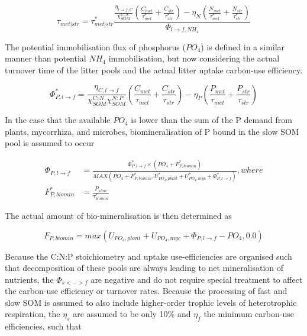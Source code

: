 \begin{equation}
 \tau_{met|str} = \tau^{*}_{met|str} \frac{\frac{\eta_{l \rightarrow f,C}}{\chi_{SOM}^{C:N}} (\frac{C_{met}}{\tau^{*}_{met}} + \frac{C_{str}}{\tau^{*}_{str}}) - \eta_N (\frac{N_{met}}{\tau^{*}_{met}} + \frac{N_{str}}{\tau^{*}_{str}})}{\Phi_{l \rightarrow f,NH_4}}
\end{equation}

The potential immobilisation flux of phosphorus ($PO_4$) is defined in a similar manner than potential $NH_4$ immobilisation, but now considering the actual turnover time of the litter pools and the actual litter uptake carbon-use efficiency.

\begin{equation}
\Phi^{*}_{P,l \rightarrow f} = \frac{\eta_{C,l \rightarrow f}}{\chi_{SOM}^{C:N}\chi_{SOM}^{N:P}} (\frac{C_{met}}{\tau_{met}} + \frac{C_{str}}{\tau_{str}}) - \eta_P (\frac{P_{met}}{\tau_{met}} + \frac{P_{str}}{\tau_{str}})
\end{equation} 

In the case that the available $PO_4$ is lower than the sum of the P demand from plants, mycorrhiza, and microbes, biomineralisation of P bound in the slow SOM pool is assumed to occur 

\begin{subequations}\label{eq:sb:simple_pot_p_immobilisation}
\begin{align}
\Phi_{P,l \rightarrow f} &= \frac{\Phi^{*}_{P,l \rightarrow f} \times (PO_4 + F^{*}_{P,biomin})}{MAX(PO_4 + F^{*}_{P,biomin}, U^{*}_{PO_4,plant} + U^{*}_{PO_4,myc} + \Phi^{*}_{P,l \rightarrow f})}, where \\
F^{*}_{P,biomin} &= \frac{P_{slow}}{\tau^{*}_{biomin}}  
\end{align}
\end{subequations}

The actual amount of bio-mineralisation is then determined as 

\begin{equation}
F_{P,biomin} = max(U_{PO_4,plant} + U_{PO_4,myc} + \Phi_{P,l \rightarrow f} - PO_4, 0.0)
\end{equation}

Because the C:N:P stoichiometry and uptake use-efficiencies are organised such that decomposition of these pools are always leading to net mineralisation of nutrients, the $\Phi_{s <-> f}$ are negative and do not require special treatment to affect the carbon-use efficiency or turnover rates. Because the processing of fast and slow SOM is assumed to also include higher-order trophic levels of heterotrophic respiration, the $\eta_{s}$ are assumed to be only 10\% and $\eta_{f}$ the minimum carbon-use efficiencies, such that


